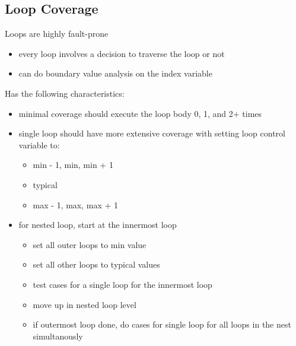 \documentclass[11pt]{article}
\begin{document}
\subsection{Loop Coverage}
\label{sec:org7610e97}
Loops are highly fault-prone
\begin{itemize}
\item every loop involves a decision to traverse the loop or not
\item can do boundary value analysis on the index variable
\end{itemize}

Has the following characteristics:
\begin{itemize}
\item minimal coverage should execute the loop body 0, 1, and 2+ times
\item single loop should have more extensive coverage with setting loop control variable to:
\begin{itemize}
\item min - 1, min, min + 1
\item typical
\item max - 1, max, max + 1
\end{itemize}
\item for nested loop, start at the innermost loop
\begin{itemize}
\item set all outer loops to min value
\item set all other loops to typical values
\item test cases for a single loop for the innermost loop
\item move up in nested loop level
\item if outermost loop done, do cases for single loop for all loops
in the nest simultanously
\end{itemize}
\end{itemize}
\end{document}
